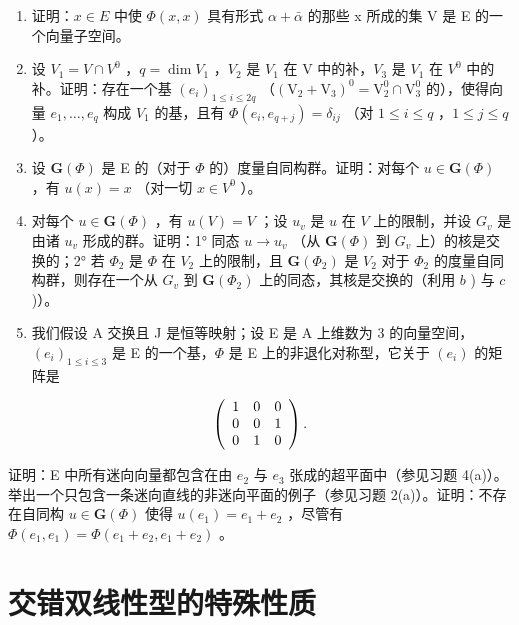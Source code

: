 \begin{enumerate}
\def\labelenumi{\alph{enumi})}
\item
  证明：\(x \in E\) 中使 \(\Phi(x, x)\) 具有形式 \(\alpha + \bar{\alpha}\) 的那些 x 所成的集 V 是 E 的一个向量子空间。
\item
  设 \(V_{1}=V\cap V^{0}\) ，\(q=\dim V_{1}\) ，\(V_{2}\) 是 \(V_{1}\) 在 V 中的补，\(V_{3}\) 是 \(V_{1}\) 在 \(V^{0}\) 中的补。证明：存在一个基 \((e_{i})_{1\leqslant i\leqslant2q}\) （\((\mathrm{V}_{2}+\mathrm{V}_{3})^{0}=\mathrm{V}_{2}^{0}\cap\mathrm{V}_{3}^{0}\) 的），使得向量 \(e_1, \ldots, e_q\) 构成 \(V_1\) 的基，且有 \(\Phi(e_i, e_{q+j}) = \delta_{ij}\) （对 \(1 \leqslant i \leqslant q\) ，\(1 \leqslant j \leqslant q\) ）。
\item
  设 \(\mathbf{G}(\Phi)\) 是 E 的（对于 \(\Phi\) 的）度量自同构群。证明：对每个 \(u \in \mathbf{G}(\Phi)\) ，有 \(u(x) = x\) （对一切 \(x \in V^0\) ）。
\item
  对每个 \(u \in \mathbf{G}(\Phi)\) ，有 \(u(V) = V\) ；设 \(u_{v}\) 是 \(u\) 在 \(V\) 上的限制，并设 \(G_{v}\) 是由诸 \(u_{v}\) 形成的群。证明：1° 同态 \(u \to u_{v}\) （从 \(\mathbf{G}(\Phi)\) 到 \(G_{v}\) 上）的核是交换的；2° 若 \(\Phi_{2}\) 是 \(\Phi\) 在 \(V_{2}\) 上的限制，且 \(\mathbf{G}(\Phi_{2})\) 是 \(V_{2}\) 对于 \(\Phi_{2}\) 的度量自同构群，则存在一个从 \(G_{v}\) 到 \(\mathbf{G}(\Phi_{2})\) 上的同态，其核是交换的（利用 \(b\) ) 与 \(c\) )）。
\item
  我们假设 A 交换且 J 是恒等映射；设 E 是 A 上维数为 3 的向量空间，\((e_{i})_{1\leqslant i\leqslant3}\) 是 E 的一个基，\(\Phi\) 是 E 上的非退化对称型，它关于 \((e_{i})\) 的矩阵是
\end{enumerate}

\[
\left( \begin{array}{c c c} 1 & 0 & 0 \\ 0 & 0 & 1 \\ 0 & 1 & 0 \end{array} \right).
\]

证明：E 中所有迷向向量都包含在由 \(e_{2}\) 与 \(e_{3}\) 张成的超平面中（参见习题 4(a)）。举出一个只包含一条迷向直线的非迷向平面的例子（参见习题 2(a)）。证明：不存在自同构 \(u \in \mathbf{G}(\Phi)\) 使得 \(u(e_{1}) = e_{1} + e_{2}\) ，尽管有 \(\Phi(e_{1}, e_{1}) = \Phi(e_{1} + e_{2}, e_{1} + e_{2})\) 。

\section{交错双线性型的特殊性质}

